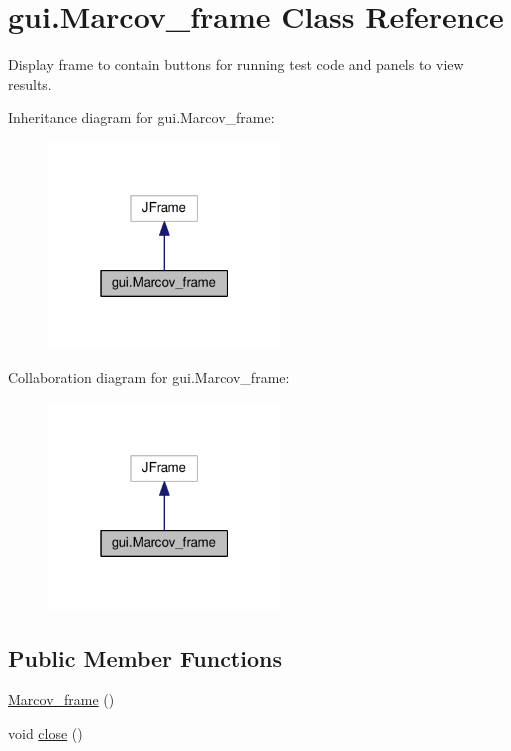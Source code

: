 \hypertarget{classgui_1_1_marcov__frame}{}\section{gui.\+Marcov\+\_\+frame Class Reference}
\label{classgui_1_1_marcov__frame}


Display frame to contain buttons for running test code and panels to view results.  




Inheritance diagram for gui.\+Marcov\+\_\+frame\+:\nopagebreak
\begin{figure}[H]
\begin{center}
\leavevmode
\includegraphics[width=175pt]{classgui_1_1_marcov__frame__inherit__graph}
\end{center}
\end{figure}


Collaboration diagram for gui.\+Marcov\+\_\+frame\+:\nopagebreak
\begin{figure}[H]
\begin{center}
\leavevmode
\includegraphics[width=175pt]{classgui_1_1_marcov__frame__coll__graph}
\end{center}
\end{figure}
\subsection*{Public Member Functions}
\begin{DoxyCompactItemize}
\item 
\hyperlink{classgui_1_1_marcov__frame_aeecc6459e2ff204f7212bf60f6c9d609}{Marcov\+\_\+frame} ()
\item 
void \hyperlink{classgui_1_1_marcov__frame_ac4a093f65a00cef89c56f3e63d23d429}{close} ()
\end{DoxyCompactItemize}


